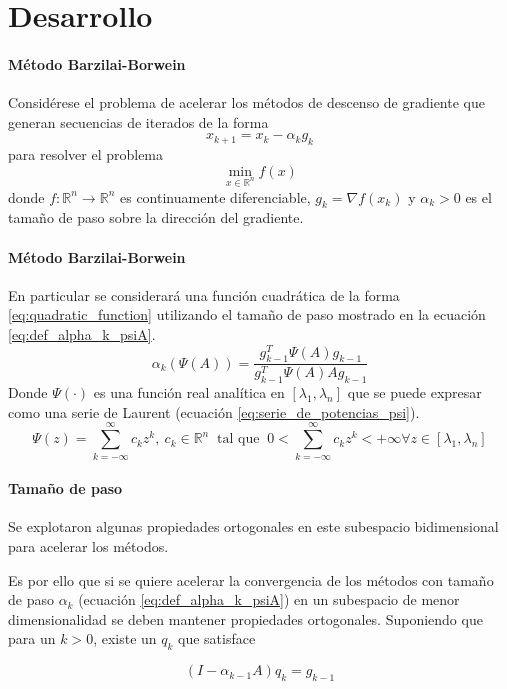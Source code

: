 \section{Desarrollo}

\begin{frame}{\insertsectionhead}
    \framesubtitle{Método Barzilai-Borwein}
    Considérese el problema de acelerar los métodos de descenso de gradiente que generan secuencias de iterados de la forma
    \begin{equation*}
        x_{k+1} = x_k - \alpha_k g_k
    \end{equation*}
    para resolver el problema
    \begin{equation*}
        \min_{x\in\mathbb{R}^n}f(x)
    \end{equation*}
    donde $f:\mathbb{R}^n \rightarrow \mathbb{R}^n$ es continuamente diferenciable, $g_k=\nabla f(x_k)$ y $\alpha_k>0$ es el tamaño de paso sobre la dirección del gradiente.
\end{frame}

\begin{frame}{\insertsectionhead}
    \framesubtitle{Método Barzilai-Borwein}
    En particular se considerará una función cuadrática de la forma \ref{eq:quadratic_function} utilizando el tamaño de paso mostrado en la ecuación \ref{eq:def_alpha_k_psiA}.
    \begin{equation}
        \alpha_k(\Psi(A)) = \frac{g_{k-1}^T\Psi(A)g_{k-1}}{g^T_{k-1}\Psi(A)Ag_{k-1}} \label{eq:def_alpha_k_psiA}
    \end{equation}
    Donde $\Psi(\cdot)$ es una función real analítica en $[\lambda_1, \lambda_n]$ que se puede expresar como una serie de Laurent (ecuación \ref{eq:serie_de_potencias_psi}).
    \begin{equation}
        \Psi(z) = \sum\limits_{k=-\infty}^{\infty} c_kz^k,\ c_k\in \mathbb{R}^n  \;\; \text{tal que} \;\; 0<\sum_{k =- \infty}^{\infty}c_k z^k<+\infty \forall z\in[\lambda_1,  \lambda_n]  \label{eq:serie_de_potencias_psi}
    \end{equation}
\end{frame}

\begin{frame}{\insertsectionhead}
    \framesubtitle{Tamaño de paso}
    Se explotaron algunas propiedades ortogonales en este subespacio bidimensional para acelerar los métodos.

    Es por ello que si se quiere acelerar la convergencia de los métodos con tamaño de paso $\alpha_k$ (ecuación \ref{eq:def_alpha_k_psiA}) en un subespacio de menor dimensionalidad se deben mantener propiedades ortogonales. Suponiendo que para un $k>0$, existe un $q_k$ que satisface

    \begin{equation*}
        (I-\alpha_{k-1}A)q_k = g_{k-1}
        \label{eq:qdef}
    \end{equation*}
\end{frame}

